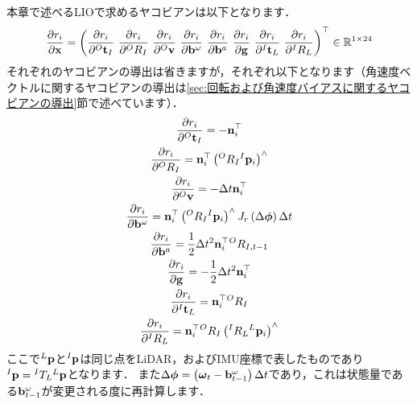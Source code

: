 本章で述べるLIOで求めるヤコビアンは以下となります．
%
\begin{align}
  \frac{ \partial r_{i} }{ \partial {\bf x} }
  = \left(
    \frac{ \partial r_{i} }{ \partial {}^{O}{\bf t}_{I} } ~
    \frac{ \partial r_{i} }{ \partial {}^{O}R_{I} } ~
    \frac{ \partial r_{i} }{ \partial {}^{O}{\bf v} } ~
    \frac{ \partial r_{i} }{ \partial {\bf b}^{\omega} } ~
    \frac{ \partial r_{i} }{ \partial {\bf b}^{a} } ~
    \frac{ \partial r_{i} }{ \partial {\bf g} } ~
    \frac{ \partial r_{i} }{ \partial {}^{I}{\bf t}_{L} } ~
    \frac{ \partial r_{i} }{ \partial {}^{I}R_{L} }
  \right)^{\top} \in \mathbb{R}^{1 \times 24}
  \label{eq:residual_jecobian_tight}
\end{align}
%
それぞれのヤコビアンの導出は省きますが，それぞれ以下となります（角速度ベクトルに関するヤコビアンの導出は\ref{sec:回転および角速度バイアスに関するヤコビアンの導出}節で述べています）．
%
\begin{align}
  \begin{gathered}
    \frac{ \partial r_{i} }{ \partial {}^{O}{\bf t}_{I} } = -{\bf n}_{i}^{\top} \\
%
    \frac{ \partial r_{i} }{ \partial {}^{O}R_{I} } = {\bf n}_{i}^{\top} \left( {}^{O}R_{I} {}^{I}{\bf p}_{i} \right)^{\wedge} \\
%
    \frac{ \partial r_{i} }{ \partial {}^{O}{\bf v} } = -\Delta t {\bf n}_{i}^{\top} \\
%
    \frac{ \partial r_{i} }{ \partial {\bf b}^{\omega} } = {\bf n}_{i}^{\top} \left( {}^{O}R_{I} {}^{I}{\bf p}_{i} \right)^{\wedge} J_{r} \left( \Delta \boldsymbol \phi \right) \Delta t \\
%
    \frac{ \partial r_{i} }{ \partial {\bf b}^{a} } = \frac{1}{2} \Delta t^{2} {\bf n}_{i}^{\top} {}^{O}R_{I, t-1} \\
%
    \frac{ \partial r_{i} }{ \partial {\bf g} } = -\frac{1}{2} \Delta t^{2} {\bf n}_{i}^{\top} \\
%
    \frac{ \partial r_{i} }{ \partial {}^{I}{\bf t}_{L} } = {\bf n}_{i}^{\top} {}^{O}R_{I} \\
%
    \frac{ \partial r_{i} }{ \partial {}^{I}R_{L} } = {\bf n}_{i}^{\top} {}^{O}R_{I} \left( {}^{I}R_{L} {}^{L}{\bf p}_{i} \right)^{\wedge} \\
  \end{gathered}
\end{align}
%
ここで${}^{L}{\bf p}$と${}^{I}{\bf p}$は同じ点をLiDAR，およびIMU座標で表したものであり${}^{I}{\bf p} = {}^{I}T_{L} {}^{L}{\bf p}$となります．
また$\Delta \boldsymbol \phi = \left( \boldsymbol \omega_{t} - {\bf b}_{t-1}^{\omega} \right) \Delta t$であり，これは状態量である${\bf b}_{t-1}^{\omega}$が変更される度に再計算します．

